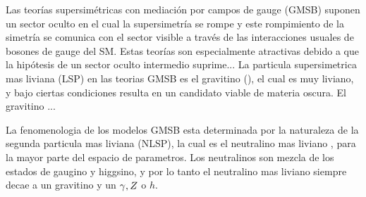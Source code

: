 Las teorías supersimétricas con mediación por campos de gauge (GMSB) \cite{Dine:1981gu,AlvarezGaume:1981wy,Nappi:1982hm,Dine:1993yw,Dine:1994vc,Dine:1995ag}
suponen un sector oculto en el cual la supersimetría se rompe y este rompimiento
de la simetría se comunica con el sector visible a través de las interacciones
usuales de bosones de gauge del SM. Estas teorías son especialmente atractivas
debido a que la hipótesis de un sector oculto intermedio suprime... La particula
supersimetrica mas liviana (LSP) en las teorias GMSB es el gravitino (\gravino),
el cual es muy liviano, y bajo ciertas condiciones resulta en un candidato
viable de materia oscura. El gravitino ...




La fenomenologia de los modelos GMSB esta determinada por la naturaleza de la segunda
particula mas liviana (NLSP), la cual es el neutralino mas liviano {\ninoone}, para
la mayor parte del espacio de parametros.
Los neutralinos son mezcla de los estados de gaugino y higgsino, y por lo tanto el
neutralino mas liviano siempre decae a un gravitino y un $\gamma, Z$ o $h$.


